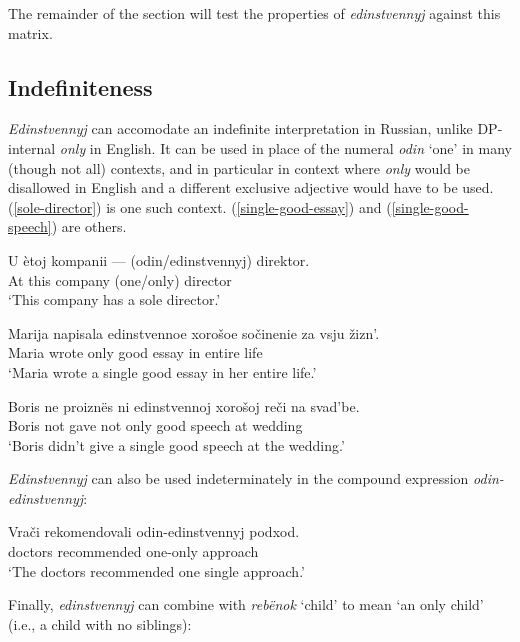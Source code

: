 The remainder of the section will test the properties of \textit{edinstvennyj} against this matrix.

\subsection{Indefiniteness}
\textit{Edinstvennyj} can accomodate an indefinite interpretation in Russian, unlike DP-internal \textit{only} in English. It can be used in place of the numeral \textit{odin} `one' in many (though not all) contexts, and in particular in context where \textit{only} would be disallowed in English and a different exclusive adjective would have to be used. (\ref{sole-director}) is one such context. (\ref{single-good-essay}) and (\ref{single-good-speech}) are others.

\begin{exe}
	\ex \label{sole-director} \gll U \`{e}toj kompanii --- (odin/edinstvennyj) direktor.\\
	At this company {} (one/only) director\\
	\glt `This company has a sole director.'

	\ex \label{single-good-essay} \gll Marija napisala edinstvennoe xoro\v{s}oe so\v{c}inenie za vsju \v{z}izn'.\\
	Maria wrote only good essay in entire life\\
	\glt `Maria wrote a single good essay in her entire life.'

	\ex \label{single-good-speech} \gll Boris ne proizn\"{e}s ni edinstvennoj xoro\v{s}oj re\v{c}i na svad'be.\\
	Boris not gave not only good speech at wedding\\
	\glt `Boris didn't give a single good speech at the wedding.'
\end{exe}

\textit{Edinstvennyj} can also be used indeterminately in the compound expression \textit{odin-edinstvennyj}:

\begin{exe}
	\ex \label{odin-edinstvennyj} \gll Vra\v{c}i rekomendovali odin-edinstvennyj podxod.\\
	doctors recommended one-only approach\\
	`The doctors recommended one single approach.'
\end{exe}

Finally, \textit{edinstvennyj} can combine with \textit{reb\"{e}nok} `child' to mean `an only child' (i.e., a child with no siblings):

